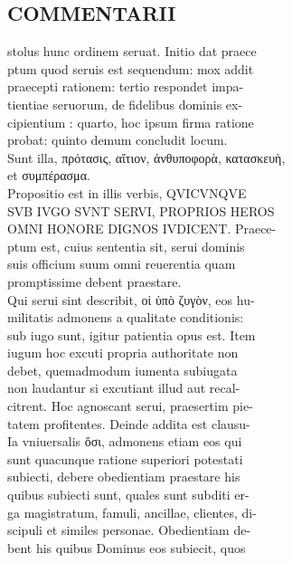\documentclass{article}
\begin{document}
\begin{pages}
\section*{COMMENTARII \\
                }stolus hunc ordinem seruat. Initio dat praece \\
                ptum quod seruis est sequendum: mox addit \\
                praecepti rationem: tertio respondet impa- \\
                tientiae seruorum, de fidelibus dominis ex- \\
                cipientium : quarto, hoc ipsum firma ratione \\
                probat: quinto demum concludit locum. \\
                Sunt illa, πρότασις, αἴτιον, ἀνθυποφορὰ, κατασκευὴ, \\
                et συμπέρασμα. \\
                Propositio est in illis verbis, QVICVNQVE \\
                SVB IVGO SVNT SERVI, PROPRIOS HEROS \\
                OMNI HONORE DIGNOS IVDICENT. Praece- \\
                ptum est, cuius sententia sit, serui dominis \\
                suis officium suum omni reuerentia quam \\
                promptissime debent praestare. \\
                Qui serui sint describit, οἱ ὑπὸ ζυγὸν, eos hu- \\
                militatis admonens a qualitate conditionis: \\
                sub iugo sunt, igitur patientia opus est. Item \\
                iugum hoc excuti propria authoritate non \\
                debet, quemadmodum iumenta subiugata \\
                non laudantur si excutiant illud aut recal- \\
                citrent. Hoc agnoscant serui, praesertim pie- \\
                tatem profitentes. Deinde addita est clausu- \\
                Ia vniuersalis ὅσι, admonens etiam eos qui \\
                sunt quacunque ratione superiori potestati \\
                subiecti, debere obedientiam praestare his \\
                quibus subiecti sunt, quales sunt subditi er- \\
                ga magistratum, famuli, ancillae, clientes, di- \\
                scipuli et similes personae. Obedientiam de- \\
                bent his quibus Dominus eos subiecit, quos \\
                

\end{pages}
\end{document}
